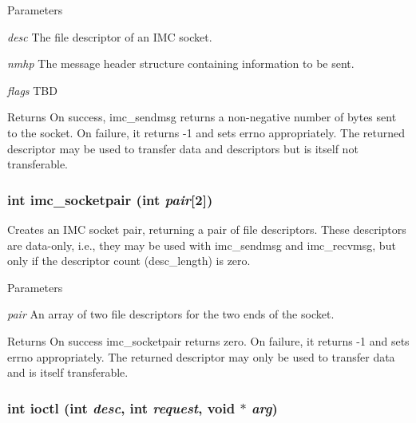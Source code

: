 \begin{DoxyParams}{Parameters}
\item[{\em desc}]The file descriptor of an IMC socket. \item[{\em nmhp}]The message header structure containing information to be sent. \item[{\em flags}]TBD \end{DoxyParams}
\begin{DoxyReturn}{Returns}
On success, imc\_\-sendmsg returns a non-\/negative number of bytes sent to the socket. On failure, it returns -\/1 and sets errno appropriately. The returned descriptor may be used to transfer data and descriptors but is itself not transferable. 
\end{DoxyReturn}
\hypertarget{group__syscalls_ga80848569a6564f83a78a2975af2e621f}{
\subsubsection[{imc\_\-socketpair}]{\setlength{\rightskip}{0pt plus 5cm}int imc\_\-socketpair (int {\em pair}\mbox{[}2\mbox{]})}}
\label{group__syscalls_ga80848569a6564f83a78a2975af2e621f}
Creates an IMC socket pair, returning a pair of file descriptors. These descriptors are data-\/only, i.e., they may be used with imc\_\-sendmsg and imc\_\-recvmsg, but only if the descriptor count (desc\_\-length) is zero. 
\begin{DoxyParams}{Parameters}
\item[{\em pair}]An array of two file descriptors for the two ends of the socket. \end{DoxyParams}
\begin{DoxyReturn}{Returns}
On success imc\_\-socketpair returns zero. On failure, it returns -\/1 and sets errno appropriately. The returned descriptor may only be used to transfer data and is itself transferable. 
\end{DoxyReturn}
\hypertarget{group__syscalls_ga546661554019fd9554cf4526305c24fd}{
\subsubsection[{ioctl}]{\setlength{\rightskip}{0pt plus 5cm}int ioctl (int {\em desc}, \/  int {\em request}, \/  void $\ast$ {\em arg})}}
\label{group__syscalls_ga546661554019fd9554cf4526305c24fd}
